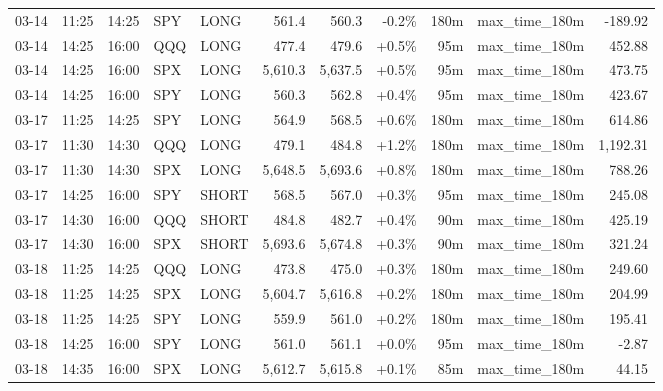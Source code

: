 \documentclass[11pt,a4paper,twoside]{article}
\begin{document}
\begin{center}
\begin{longtable}{>{\color{txtmain}}l l l l l r r r r >{\color{txtmain}}l r}
03-14 & 11:25 & 14:25 & SPY & LONG & 561.4 & 560.3 & \textcolor{lossred}{-0.2\%} & 180m & max\_time\_180m & \textcolor{lossred}{-189.92} \\
03-14 & 14:25 & 16:00 & QQQ & LONG & 477.4 & 479.6 & \textcolor{wingreen}{+0.5\%} & 95m & max\_time\_180m & \textcolor{wingreen}{452.88} \\
03-14 & 14:25 & 16:00 & SPX & LONG & 5,610.3 & 5,637.5 & \textcolor{wingreen}{+0.5\%} & 95m & max\_time\_180m & \textcolor{wingreen}{473.75} \\
03-14 & 14:25 & 16:00 & SPY & LONG & 560.3 & 562.8 & \textcolor{wingreen}{+0.4\%} & 95m & max\_time\_180m & \textcolor{wingreen}{423.67} \\
03-17 & 11:25 & 14:25 & SPY & LONG & 564.9 & 568.5 & \textcolor{wingreen}{+0.6\%} & 180m & max\_time\_180m & \textcolor{wingreen}{614.86} \\
03-17 & 11:30 & 14:30 & QQQ & LONG & 479.1 & 484.8 & \textcolor{wingreen}{+1.2\%} & 180m & max\_time\_180m & \textcolor{wingreen}{1,192.31} \\
03-17 & 11:30 & 14:30 & SPX & LONG & 5,648.5 & 5,693.6 & \textcolor{wingreen}{+0.8\%} & 180m & max\_time\_180m & \textcolor{wingreen}{788.26} \\
03-17 & 14:25 & 16:00 & SPY & SHORT & 568.5 & 567.0 & \textcolor{wingreen}{+0.3\%} & 95m & max\_time\_180m & \textcolor{wingreen}{245.08} \\
03-17 & 14:30 & 16:00 & QQQ & SHORT & 484.8 & 482.7 & \textcolor{wingreen}{+0.4\%} & 90m & max\_time\_180m & \textcolor{wingreen}{425.19} \\
03-17 & 14:30 & 16:00 & SPX & SHORT & 5,693.6 & 5,674.8 & \textcolor{wingreen}{+0.3\%} & 90m & max\_time\_180m & \textcolor{wingreen}{321.24} \\
03-18 & 11:25 & 14:25 & QQQ & LONG & 473.8 & 475.0 & \textcolor{wingreen}{+0.3\%} & 180m & max\_time\_180m & \textcolor{wingreen}{249.60} \\
03-18 & 11:25 & 14:25 & SPX & LONG & 5,604.7 & 5,616.8 & \textcolor{wingreen}{+0.2\%} & 180m & max\_time\_180m & \textcolor{wingreen}{204.99} \\
03-18 & 11:25 & 14:25 & SPY & LONG & 559.9 & 561.0 & \textcolor{wingreen}{+0.2\%} & 180m & max\_time\_180m & \textcolor{wingreen}{195.41} \\
03-18 & 14:25 & 16:00 & SPY & LONG & 561.0 & 561.1 & \textcolor{wingreen}{+0.0\%} & 95m & max\_time\_180m & \textcolor{lossred}{-2.87} \\
03-18 & 14:35 & 16:00 & SPX & LONG & 5,612.7 & 5,615.8 & \textcolor{wingreen}{+0.1\%} & 85m & max\_time\_180m & \textcolor{wingreen}{44.15} \\

\end{longtable}
\end{center}
\end{document}
